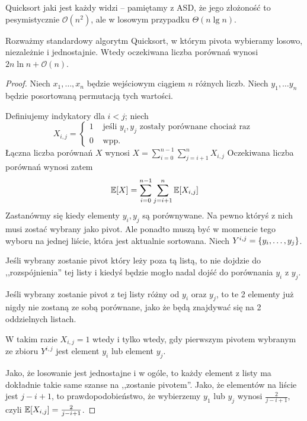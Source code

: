 Quicksort jaki jest każdy widzi -- pamiętamy z ASD, że jego złożoność to pesymistycznie \( \mathcal{O}(n^2) \), ale w losowym przypadku \( \Theta(n \lg n) \).

\begin{theorem}[2.11 P\&C]
	Rozważmy standardowy algorytm Quicksort, w którym pivota wybieramy losowo, niezależnie i jednostajnie.
	Wtedy oczekiwana liczba porównań wynosi \( 2n \ln n + \mathcal{O}(n) \).
\end{theorem}
\begin{proof} Niech \( x_1, \dots, x_n \) będzie wejściowym ciągiem \( n \) różnych liczb.
	Niech \( y_1, \dots y_n \) będzie posortowaną permutacją tych wartości.

	Definiujemy indykatory dla \( i < j \); niech
	\[
		X_{i, j} = \begin{cases}
			1 & \text{ jeśli }  y_i, y_j \text{ zostały porównane chociaż raz } \\
			0 & \text{ wpp. }
		\end{cases}
	\]
	Łączna liczba porównań \( X \) wynosi
	\(
	X = \sum_{i = 0}^{n-1} \sum_{j=i+1}^n X_{i, j}
	\)
	Oczekiwana liczba porównań wynosi zatem
	\[
		\expected{X} = \sum_{i = 0}^{n-1} \sum_{j=i+1}^n \expected{X_{i, j}}
	\]
	Zastanówmy się kiedy elementy \( y_i, y_j \) są porównywane. Na pewno któryś z nich musi zostać wybrany jako pivot.
	Ale ponadto muszą być w momencie tego wyboru na jednej liście, która jest aktualnie sortowana.
	Niech \( Y^{i, j} = \set{y_i, \dots, y_j} \).

	Jeśli wybrany zostanie pivot który leży poza tą listą, to nie dojdzie do ,,rozspójnienia'' tej listy i kiedyś będzie mogło nadal dojść do porównania \(y_i\) z \(y_j\).

	Jeśli wybrany zostanie pivot z tej listy różny od \(y_i\) oraz \(y_j\), to te 2 elementy już nigdy nie zostaną ze sobą porównane, jako że będą znajdywać się na 2 oddzielnych listach.

	W takim razie \( X_{i, j} = 1 \) wtedy i tylko wtedy, gdy pierwszym pivotem wybranym ze zbioru \( Y^{i, j} \) jest element \( y_i \) lub element \( y_j \).

	Jako, że losowanie jest jednostajne i w ogóle, to każdy element z listy ma dokładnie takie same szanse na ,,zostanie pivotem''. Jako, że elementów na liście jest \(j-i+1\), to prawdopodobieństwo, że wybierzemy \(y_1\) lub \(y_j\) wynosi \( \frac{2}{j - i + 1} \), czyli \( \expected{X_{i, j}} = \frac{2}{j - i + 1} \).


\end{proof}

